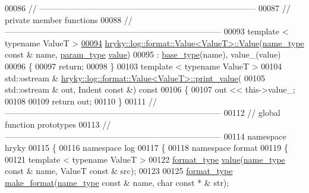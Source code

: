 \begin{DoxyCode}
00086 \textcolor{comment}{//
      ------------------------------------------------------------------------------}
00087 \textcolor{comment}{// private member functions}
00088 \textcolor{comment}{//
      ------------------------------------------------------------------------------}
00093 \textcolor{comment}{}\textcolor{keyword}{template} < \textcolor{keyword}{typename} ValueT >
\hypertarget{log__format__value_8h_source_l00094}{}\hyperlink{classhryky_1_1log_1_1format_1_1_value_a6c65d94e7dd9c06484f703455dec523e}{00094} \hyperlink{classhryky_1_1log_1_1format_1_1_value}{hryky::log::format::Value<ValueT>::Value}(\hyperlink{namespacehryky_1_1log_1_1format_ab7408d1e2ed2d648dbf9bba69eb74288}{name_type} \textcolor{keyword}{const} & name, \hyperlink{classhryky_1_1log_1_1format_1_1_value_a4e6e8d8330ce51833a08aa0aab7586a4}{param_type} 
      \hyperlink{namespacehryky_1_1log_1_1format_a5b9af9c1a7b018d54144acfb1b8cc960}{value})
00095     : \hyperlink{classhryky_1_1log_1_1format_1_1_base}{base_type}(name), value\_(value)
00096 \{
00097     \textcolor{keywordflow}{return};
00098 \}
00103 \textcolor{keyword}{template} < \textcolor{keyword}{typename} ValueT >
00104 std::ostream & \hyperlink{classhryky_1_1log_1_1format_1_1_value}{hryky::log::format::Value<ValueT>::print_value}(
00105     std::ostream & out, Indent \textcolor{keyword}{const} &)\textcolor{keyword}{ const}
00106 \textcolor{keyword}{}\{
00107     out << this->value\_;
00108     
00109     \textcolor{keywordflow}{return} out;
00110 \}
00111 \textcolor{comment}{//
      ------------------------------------------------------------------------------}
00112 \textcolor{comment}{// global function prototypes}
00113 \textcolor{comment}{//
      ------------------------------------------------------------------------------}
00114 \textcolor{keyword}{namespace }hryky
00115 \{
00116 \textcolor{keyword}{namespace }log
00117 \{
00118 \textcolor{keyword}{namespace }format
00119 \{
00121     \textcolor{keyword}{template} < \textcolor{keyword}{typename} ValueT >
00122     \hyperlink{classhryky_1_1_intrusive_ptr}{format_type} \hyperlink{namespacehryky_1_1log_1_1format_a5b9af9c1a7b018d54144acfb1b8cc960}{value}(\hyperlink{namespacehryky_1_1log_1_1format_ab7408d1e2ed2d648dbf9bba69eb74288}{name_type} \textcolor{keyword}{const} & name, ValueT \textcolor{keyword}{const} & src);
00123 
00125     \hyperlink{classhryky_1_1_intrusive_ptr}{format_type} \hyperlink{namespacehryky_1_1log_1_1format_ae8ca636c4b89fe300287aca4f870f2ef}{make_format}(\hyperlink{namespacehryky_1_1log_1_1format_ab7408d1e2ed2d648dbf9bba69eb74288}{name_type} \textcolor{keyword}{const} & name, \textcolor{keywordtype}{char} \textcolor{keyword}{const} * & str);

\end{DoxyCode}
